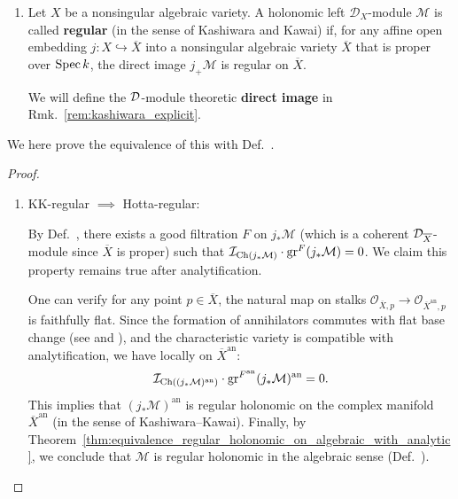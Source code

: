 \begin{remark}
\begin{remark}
\begin{enumerate}
                  Here $\mathcal{I}_{\Ch(\mathcal{M})}\subseteq\mathcal{O}_{T^\ast(X)}$ is defined as:
                  \[
                      \mathcal{I}_{\Ch(\mathcal{M})}:= \sqrt{\vphantom{\big|}\mathrm{Ann}_{\gr \D_X}\gr \mathcal{M}}
                  \]

            \item \cite[Def.~21.5.]{schnell_dmodules_notes}
                  Let $X$ be a nonsingular algebraic variety.
                  A holonomic left $\mathcal{D}_X$-module $\mathcal{M}$ is called \textbf{regular} (in the sense of Kashiwara and Kawai)
                  if, for any affine open embedding $j: X \hookrightarrow \overline{X}$ into a nonsingular algebraic variety $\overline{X}$
                  that is proper over $\operatorname{Spec} k$, the direct image $j_+ \mathcal{M}$ is regular on $\overline{X}$.

                  We will define the $\mathcal{D}$-module theoretic \textbf{direct image} in Rmk.~\ref{rem:kashiwara_explicit}.
        \end{enumerate}

        We here prove the equivalence of this with Def.~\cite[Def.~6.1.1.]{hotta2008d}.
    \end{remark}
    \begin{proof}
        \mbox{}

        \begin{enumerate}
            \item KK-regular $\implies$ Hotta-regular:

                  By Def.~\cite[Def.~21.5.]{schnell_dmodules_notes}, there exists a good filtration $F$ on $j_\ast\mathcal{M}$ (which is a coherent $\mathcal{D}_{\overline{X}}$-module since $\overline{X}$ is proper) such that $\mathcal{I}_{\operatorname{Ch}(j_\ast\mathcal{M})} \cdot \operatorname{gr}^F (j_\ast\mathcal{M}) = 0$.
                  We claim this property remains true after analytification.

                  One can verify for any point $p \in \overline{X}$, the natural map on stalks $\mathcal{O}_{\overline{X},p} \to \mathcal{O}_{\overline{X}^\mathrm{an},p}$ is faithfully flat.
                  Since the formation of annihilators commutes with flat base change (see \cite[\href{https://stacks.math.columbia.edu/tag/0250}{Tag 0250}]{stacks-project} and \cite[\href{https://stacks.math.columbia.edu/tag/07T8}{Tag 07T8}]{stacks-project}), and the characteristic variety is compatible with analytification, we have locally on $\overline{X}^\mathrm{an}$:
                  \[
                      \mathcal{I}_{\operatorname{Ch}((j_\ast\mathcal{M})^\mathrm{an})} \cdot \operatorname{gr}^{F^\mathrm{an}} (j_\ast\mathcal{M})^\mathrm{an} = 0.
                  \]
                  This implies that $(j_\ast \mathcal{M})^\mathrm{an}$ is regular holonomic on the complex manifold $\overline{X}^\mathrm{an}$ (in the sense of Kashiwara--Kawai).
                  Finally, by Theorem~\ref{thm:equivalence_regular_holonomic_on_algebraic_with_analytic}, we conclude that $\mathcal{M}$ is regular holonomic in the algebraic sense (Def.~\cite[Def.~6.1.1.]{hotta2008d}).


\end{enumerate}
\end{proof}
\end{remark}
